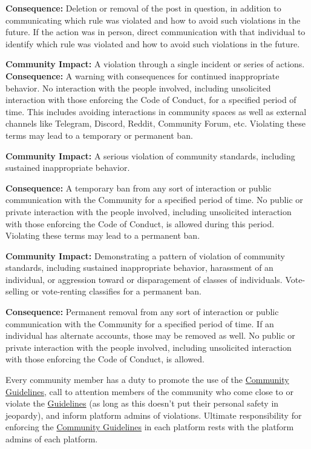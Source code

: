 	\textbf{Consequence:} Deletion or removal of the post in question, in addition to communicating which rule was violated and how to avoid such violations in the future.
	If the action was in person, direct communication with that individual to identify which rule was violated and how to avoid such violations in the future.


	\textbf{Community Impact:} A violation through a single incident or series of actions.
	\textbf{Consequence:} A warning with consequences for continued inappropriate behavior.
	No interaction with the people involved, including unsolicited interaction with those enforcing the Code of Conduct, for a specified period of time.
	This includes avoiding interactions in community spaces as well as external channels like Telegram, Discord, Reddit, Community Forum, etc.
	Violating these terms may lead to a temporary or permanent ban.


	
	\textbf{Community Impact:} A serious violation of community standards, including sustained inappropriate behavior.
	
	\textbf{Consequence:} A temporary ban from any sort of interaction or public communication with the Community for a specified period of time.
	No public or private interaction with the people involved, including unsolicited interaction with those enforcing the Code of Conduct, is allowed during this period.
	Violating these terms may lead to a permanent ban.
	
	
	
	\textbf{Community Impact:} Demonstrating a pattern of violation of community standards, including sustained inappropriate behavior, harassment of an individual, or aggression toward or disparagement of classes of individuals.
	Vote-selling or vote-renting classifies for a permanent ban.
	
	\textbf{Consequence:} Permanent removal from any sort of interaction or public communication with the Community for a specified period of time.
	If an individual has alternate accounts, those may be removed as well.
	No public or private interaction with the people involved, including unsolicited interaction with those enforcing the Code of Conduct, is allowed.


\label{sec:ReportingAndEnforcement}
	
Every community member has a duty to promote the use of the \hyperref[chap:CommunityGuidelines]{Community Guidelines}, call to attention members of the community who come close to or violate the \hyperref[chap:CommunityGuidelines]{Guidelines} (as long as this doesn’t put their personal safety in jeopardy), and inform platform admins of violations.
Ultimate responsibility for enforcing the \hyperref[chap:CommunityGuidelines]{Community Guidelines} in each platform rests with the platform admins of each platform.
	
